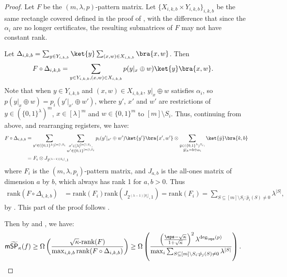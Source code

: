 \documentclass{toc}
\begin{document}
\begin{proof}
Let $F$ be the $(m,\lambda,p)$-pattern matrix. Let $\{X_{i,k,b}\times Y_{i,k,b}\}_{i,k,b}$ be the same rectangle covered defined in the proof of , with the difference that since the $\alpha_i$ are no longer certificates, the resulting submatrices of $F$ may not have constant rank. 

Let $\Delta_{i,k,b}=\sum_{y\in Y_{i,k,b}}\ket{y}\sum_{(x,w)\in X_{i,k,b}}\bra{x,w}$. Then 
\begin{align*}
F\circ \Delta_{i,k,b} &= \sum_{y\in Y_{i,k,b},(x,w)\in X_{i,k,b}}p(y|_x\oplus w)\ket{y}\bra{x,w}.
\end{align*}
Note that when $y\in Y_{i,k,b}$ and $(x,w)\in X_{i,b,k}$, $y|_x\oplus w$ satisfies $\alpha_i$, 
so $p(y|_x\oplus w)=p_i(y'|_{x'}\oplus w')$, where $y'$, $x'$ and $w'$ are restrictions of $y\in(\{0,1\}^\lambda)^m$, $x\in[\lambda]^m$ and $w\in\{0,1\}^m$ to $[m]\setminus S_i$. Thus, continuing from above, and rearranging registers, we have:
\begin{align*}
F\circ \Delta_{i,k,b}&= \sum_{y'\in (\{0,1\}^{\lambda})^{[m]\setminus S_i}}\sum_{\substack{x'\in [\lambda]^{[m]\setminus S_i},\\ w'\in\{0,1\}^{[m]\setminus S_i}}}p_i(y'|_{x'}\oplus w')\ket{y'}\bra{x',w'}\otimes \sum_{\substack{\bar{y}\in(\{0,1\}^\lambda)^{S_i}:\\ \bar{y}|_k=b\oplus\alpha_i}}\ket{\bar{y}}\bra{k,b}\\
&= F_i\otimes J_{2^{(\lambda-1)|S_i|},1}
\end{align*}
where $F_i$ is the $(m,\lambda,p_i)$-pattern matrix, and $J_{a,b}$ is the all-ones matrix of dimension $a$ by $b$, which always has rank 1 for $a,b>0$. Thus
\begin{align*}
\mbox{rank}(F\circ\Delta_{i,k,b}) &=\mathrm{rank}(F_i)\mathrm{rank}(J_{2^{(\lambda-1)|S_i|},1})=\mathrm{rank}(F_i)=\sum_{S\subseteq[m]\setminus S_i:\hat{p}_i(S)\neq 0}\lambda^{|S|},
\end{align*}
by \cite{She09}. This part of the proof follows \cite[Lemma IV.6]{RPRC16}.

Then by  and , we have:
\begin{align*}
\mathsf{m}\widetilde{\mathsf{SP}}_{\kappa}(f) &\geq \Omega\left(\frac{\sqrt{\kappa}\mbox{-rank}(F)}{\max_{i,k,b}\mathrm{rank}(F\circ\Delta_{i,k,b})}\right)
\geq \Omega\left( \frac{\left(\frac{\eps-\sqrt{\kappa}}{1+\sqrt{\kappa}}\right)^2\lambda^{\deg_\eps(p)}}{\max_i\sum_{S\subseteq[m]\setminus S_i:\hat{p}_j(S)\neq 0}\lambda^{|S|}} \right).\qedhere
\end{align*}
\end{proof}
\end{document}
